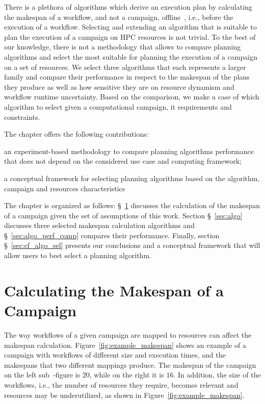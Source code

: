 There is a plethora of algorithms which derive an execution plan by calculating the makespan of a workflow, and not a campaign, offline~\cite{lu2019review}, i.e., before the execution of a workflow.
Selecting and extending an algorithm that is suitable to plan the execution of a campaign on HPC resources is not trivial.
To the best of our knowledge, there is not a methodology that allows to compare planning algorithms and select the most suitable for planning the execution of a campaign on a set of resources.
We select three algorithms that each represents a larger family and compare their performance in respect to the makespan of the plans they produce as well as how sensitive they are on resource dynamism and workflow runtime uncertainty.
Based on the comparison, we make a case of which algorithm to select given a computational campaign, it requirements and constraints.

The chapter offers the following contributions:
\begin{inparaenum}[i)]
    \item an experiment-based methodology to compare planning algorithms performance that does not depend on the considered use case and computing framework;
    \item a conceptual framework for selecting planning algorithms based on the algorithm, campaign and resources characteristics
\end{inparaenum}

The chapter is organized as follows: \S~\ref{sec:makespan_calc} discusses the calculation of the makespan of a campaign given the set of assumptions of this work.
Section \S~\ref{sec:algo} discusses three selected makespan calculation algorithms and \S~\ref{sec:algo_perf_comp} compares their performance.
Finally, section \S~\ref{sec:cf_algo_sel} presents our conclusions and a conceptual framework that will allow users to best select a planning algorithm.

\section{Calculating the Makespan of a Campaign}
\label{sec:makespan_calc}
The way workflows of a given campaign are mapped to resources can affect the makespan calculation. 
Figure~\ref{fig:example_makespan} shows an example of a campaign with workflows of different size and execution times, and the makespans that two different mappings produce.
The makespan of the campaign on the left sub~-figure is $20$, while on the right it is $16$.
In addition, the size of the workflows, i.e., the number of resources they require, becomes relevant and resources may be underutilized, as shown in Figure~\ref{fig:example_makespan}.

